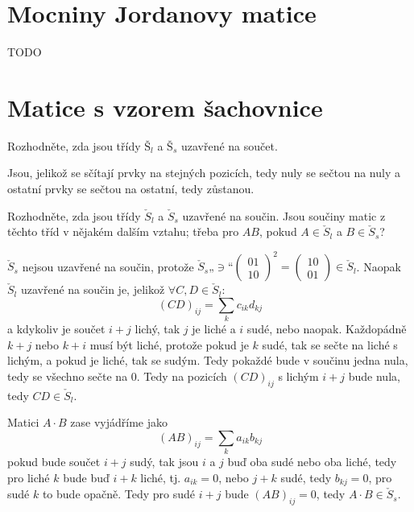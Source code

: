 \documentclass[12pt]{article}					%
\begin{document}
\section{Mocniny Jordanovy matice}
    TODO


\pagebreak

\section{Matice s vzorem šachovnice}
    \begin{priklad}[5.1]
        Rozhodněte, zda jsou třídy $Š_l$ a $Š_s$ uzavřené na součet.

        \begin{reseni}
            Jsou, jelikož se sčítají prvky na stejných pozicích, tedy nuly se sečtou na nuly a ostatní prvky se sečtou na ostatní, tedy zůstanou.
        \end{reseni}
    \end{priklad}

    \begin{priklad}
        Rozhodněte, zda jsou třídy $\check S_l$ a $\check S_s$ uzavřené na součin. Jsou součiny matic z těchto tříd v nějakém dalším vztahu; třeba pro $AB$, pokud $A \in \check S_l$ a $B \in \check S_s$?

        \begin{reseni}
            $\check S_s$ nejsou uzavřené na součin, protože $\check S_s „\ni“ \begin{pmatrix} 0 1 \\ 1 0 \end{pmatrix}^2 = \begin{pmatrix} 1 0 \\ 0 1 \end{pmatrix} \in \check S_l$. Naopak $\check S_l$ uzavřené na součin je, jelikož $\forall C, D \in \check S_l$:
            $$ (CD)_{ij} = \sum_{k} c_{ik}d_{kj} $$ 
            a kdykoliv je součet $i+j$ lichý, tak $j$ je liché a $i$ sudé, nebo naopak. Každopádně $k+j$ nebo $k+i$ musí být liché, protože pokud je $k$ sudé, tak se sečte na liché s lichým, a pokud je liché, tak se sudým. Tedy pokaždé bude v součinu jedna nula, tedy se všechno sečte na 0. Tedy na pozicích $(CD)_{ij}$ s lichým $i+j$ bude nula, tedy $CD \in \check S_l$.

            Matici $A·B$ zase vyjádříme jako
            $$ (AB)_{ij} = \sum_{k} a_{ik}b_{kj} $$
            pokud bude součet $i+j$ sudý, tak jsou $i$ a $j$ buď oba sudé nebo oba liché, tedy pro liché $k$ bude buď $i+k$ liché, tj. $a_{ik} = 0$, nebo $j+k$ sudé, tedy $b_{kj} = 0$, pro sudé $k$ to bude opačně. Tedy pro sudé $i+j$ bude $(AB)_{ij} = 0$, tedy $A·B \in \check S_s$.
        \end{reseni}
    \end{priklad}
\end{document}
